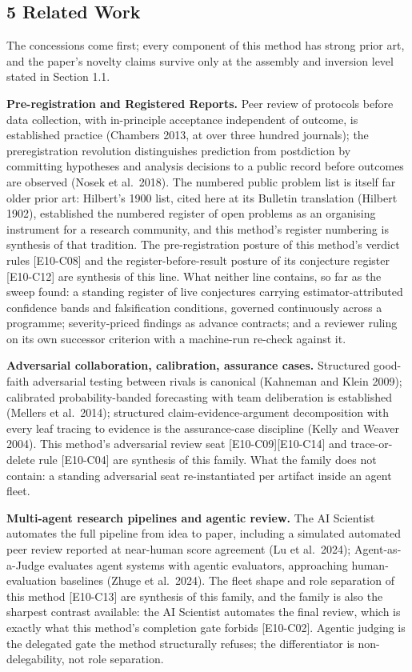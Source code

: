 \documentclass[
  11pt,
]{article}
\begin{document}
\subsection{5 Related Work}\label{related-work}

The concessions come first; every component of this method has strong
prior art, and the paper's novelty claims survive only at the assembly
and inversion level stated in Section 1.1.

\textbf{Pre-registration and Registered Reports.} Peer review of
protocols before data collection, with in-principle acceptance
independent of outcome, is established practice (Chambers 2013, at over
three hundred journals); the preregistration revolution distinguishes
prediction from postdiction by committing hypotheses and analysis
decisions to a public record before outcomes are observed (Nosek et
al.~2018). The numbered public problem list is itself far older prior
art: Hilbert's 1900 list, cited here at its Bulletin translation
(Hilbert 1902), established the numbered register of open problems as an
organising instrument for a research community, and this method's
register numbering is synthesis of that tradition. The pre-registration
posture of this method's verdict rules {[}E10-C08{]} and the
register-before-result posture of its conjecture register {[}E10-C12{]}
are synthesis of this line. What neither line contains, so far as the
sweep found: a standing register of live conjectures carrying
estimator-attributed confidence bands and falsification conditions,
governed continuously across a programme; severity-priced findings as
advance contracts; and a reviewer ruling on its own successor criterion
with a machine-run re-check against it.

\textbf{Adversarial collaboration, calibration, assurance cases.}
Structured good-faith adversarial testing between rivals is canonical
(Kahneman and Klein 2009); calibrated probability-banded forecasting
with team deliberation is established (Mellers et al.~2014); structured
claim-evidence-argument decomposition with every leaf tracing to
evidence is the assurance-case discipline (Kelly and Weaver 2004). This
method's adversarial review seat {[}E10-C09{]}{[}E10-C14{]} and
trace-or-delete rule {[}E10-C04{]} are synthesis of this family. What
the family does not contain: a standing adversarial seat re-instantiated
per artifact inside an agent fleet.

\textbf{Multi-agent research pipelines and agentic review.} The AI
Scientist automates the full pipeline from idea to paper, including a
simulated automated peer review reported at near-human score agreement
(Lu et al.~2024); Agent-as-a-Judge evaluates agent systems with agentic
evaluators, approaching human-evaluation baselines (Zhuge et al.~2024).
The fleet shape and role separation of this method {[}E10-C13{]} are
synthesis of this family, and the family is also the sharpest contrast
available: the AI Scientist automates the final review, which is exactly
what this method's completion gate forbids {[}E10-C02{]}. Agentic
judging is the delegated gate the method structurally refuses; the
differentiator is non-delegability, not role separation.
\end{document}
